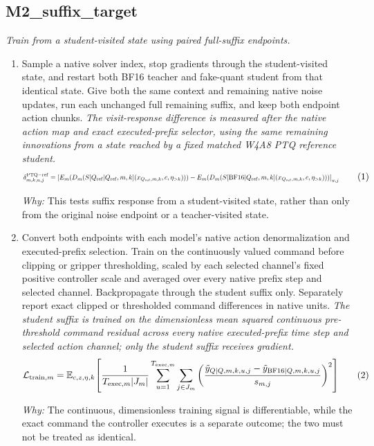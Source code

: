 \documentclass[10pt,a4paper]{article}
\begin{document}
\subsection*{M2\_suffix\_target}
\emph{Train from a student-visited state using paired full-suffix endpoints.}
\begin{enumerate}[leftmargin=*,start=3]
  \item Sample a native solver index, stop gradients through the student-visited state, and restart both BF16 teacher and fake-quant student from that identical state. Give both the same context and remaining native noise updates, run each unchanged full remaining suffix, and keep both endpoint action chunks.
\noindent\emph{The visit-response difference is measured after the native action map and exact executed-prefix selector, using the same remaining innovations from a state reached by a fixed matched W4A8 PTQ reference student.}
\begin{equation}
\resizebox{\ifdim\width>\linewidth \linewidth\else\width\fi}{!}{$\displaystyle \delta^{\mathrm{PTQ-ref}}_{m,k,u,j}=\left[E_m\!\left(D_m\!\left(S[Q_{\mathrm{ref}}|Q_{\mathrm{ref}},m,k](x_{Q_{\mathrm{ref}},m,k},c,\eta_{>k})\right)\right)-E_m\!\left(D_m\!\left(S[\mathrm{BF16}|Q_{\mathrm{ref}},m,k](x_{Q_{\mathrm{ref}},m,k},c,\eta_{>k})\right)\right)\right]_{u,j}$} \tag{1}
\end{equation}
\par\emph{Why:} This tests suffix response from a student-visited state, rather than only from the original noise endpoint or a teacher-visited state.
  \item Convert both endpoints with each model's native action denormalization and executed-prefix selection. Train on the continuously valued command before clipping or gripper thresholding, scaled by each selected channel's fixed positive controller scale and averaged over every native prefix step and selected channel. Backpropagate through the student suffix only. Separately report exact clipped or thresholded command differences in native units.
\noindent\emph{The student suffix is trained on the dimensionless mean squared continuous pre-threshold command residual across every native executed-prefix time step and selected action channel;\allowbreak{} only the student suffix receives gradient.}
\begin{equation}
\resizebox{\ifdim\width>\linewidth \linewidth\else\width\fi}{!}{$\displaystyle \mathcal{L}_{\mathrm{train},m}=\mathbb{E}_{c,z,\eta,k}\!\left[\frac{1}{T_{\mathrm{exec},m}|J_m|}\sum_{u=1}^{T_{\mathrm{exec},m}}\sum_{j\in J_m}\left(\frac{\tilde y_{Q|Q,m,k,u,j}-\tilde y_{\mathrm{BF16}|Q,m,k,u,j}}{s_{m,j}}\right)^2\right]$} \tag{2}
\end{equation}
\par\emph{Why:} The continuous, dimensionless training signal is differentiable, while the exact command the controller executes is a separate outcome;\allowbreak{} the two must not be treated as identical.
\end{enumerate}
\end{document}
